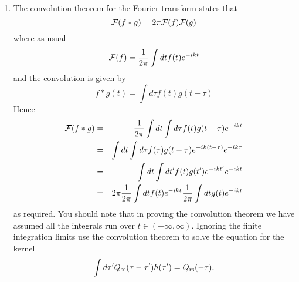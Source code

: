 \documentclass[12pt]{article}
\begin{document}
\begin{enumerate}
\item The convolution theorem for the Fourier transform states that
\begin{equation}
{\cal F}(f*g)=2\pi{\cal F}(f){\cal F}(g)
\end{equation}
where as usual
\begin{equation}
{\cal F}(f)=\frac{1}{2\pi}\int dt f(t)e^{-ikt}
\end{equation}
and the convolution is given by
\begin{equation}
f*g(t)=\int d\tau f(t)g(t-\tau)
\end{equation}
Hence 
\begin{eqnarray}
{\cal F}(f*g)&=&\frac{1}{2\pi}\int dt \int d\tau f(t)g(t-\tau) e^{-ikt}\cr
             &=&\int dt \int d\tau f(\tau)g(t-\tau) e^{-ik(t-\tau)}e^{-ik\tau}\cr
             &=&\int dt \int dt' f(t)g(t') e^{-ikt'}e^{-ikt}\cr
             &=&2\pi \frac{1}{2\pi}\int dt f(t)e^{-ikt}\frac{1}{2\pi}\int dt g(t)e^{-ikt}
\end{eqnarray}
as required. You should note that in proving the convolution theorem
we have assumed all the integrals run over $t\in
(-\infty,\infty)$. Ignoring the finite integration limits use the
convolution theorem to solve the equation for the kernel
\begin{equation}
\int {d\tau' Q_{\mbox{\scriptsize{ss}}}(\tau-\tau')h(\tau')}=Q_{\mbox{\scriptsize{rs}}}(-\tau).
\end{equation}



\end{enumerate}
\end{document}
